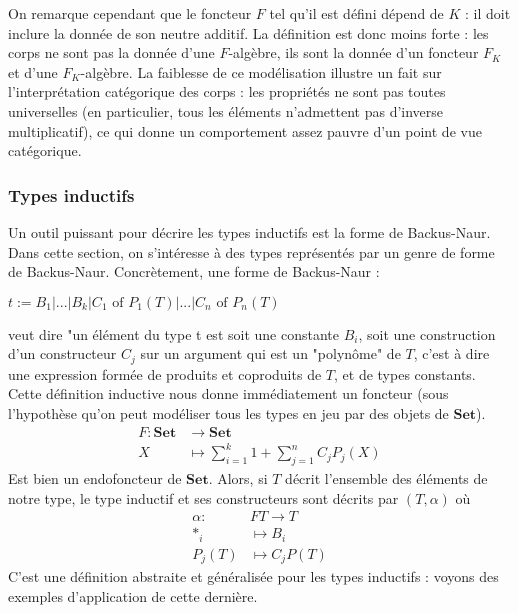 \documentclass{article}
\begin{document}
On remarque cependant que le foncteur $F$ tel qu'il est défini dépend de $K$ : il doit inclure la donnée de son neutre additif. La définition est donc moins forte : les corps ne sont pas la donnée d'une $F$-algèbre, ils sont la donnée d'un foncteur $F_K$ et d'une $F_K$-algèbre. La faiblesse de ce modélisation illustre un fait sur l'interprétation catégorique des corps : les propriétés ne sont pas toutes universelles (en particulier, tous les éléments n'admettent pas d'inverse multiplicatif), ce qui donne un comportement assez pauvre d'un point de vue catégorique.

\subsubsection{Types inductifs}


Un outil puissant pour décrire les types inductifs est la forme de Backus-Naur. Dans cette section, on s'intéresse à des types représentés par un genre de forme de Backus-Naur. Concrètement, une forme de Backus-Naur : 
\begin{center}
    $  t := B_1 | ... | B_k | C_1 \text{ of } P_1(T) | ... | C_n \text{ of } P_n(T) $
\end{center}
veut dire "un élément du type t est soit une constante $B_i$, soit une construction d'un constructeur $C_j$ sur un argument qui est un "polynôme" de $T$, c'est à dire une expression formée de produits et coproduits de $T$, et de types constants. Cette définition inductive nous donne immédiatement un foncteur (sous l'hypothèse qu'on peut modéliser tous les types en jeu par des objets de $\mathbf{Set}$).  
\begin{align*}
    F : \mathbf{Set} & \rightarrow \mathbf{Set} \\ 
    X & \mapsto \sum_{i=1}^k 1 + \sum_{j=1}^n C_j P_j(X)
\end{align*}
Est bien un endofoncteur de $\mathbf{Set}$. Alors, si $T$ décrit l'ensemble des éléments de notre type, le type inductif et ses constructeurs sont décrits par $(T,\alpha)$ où
\begin{align*}
    \alpha : & F T \rightarrow T  \\ 
    *_i & \mapsto B_i \\ 
    P_j(T) & \mapsto C_j P(T)
\end{align*}
C'est une définition abstraite et généralisée pour les types inductifs : voyons des exemples d'application de cette dernière.  \\ 
\end{document}
